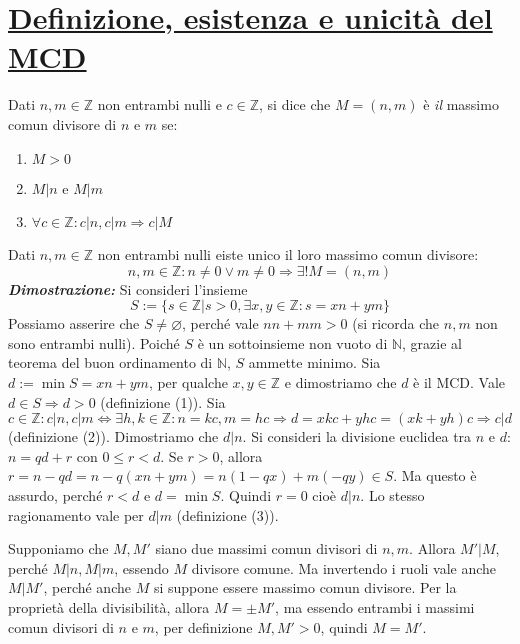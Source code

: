 \section{\underline{Definizione, esistenza e unicità del MCD}}
\begin{tcolorbox}[colback=yellow!30, colframe=yellow!30!black, title=Massimo Comun Divisore]
Dati $n,m \in \mathbb{Z}$ non entrambi nulli e $c\in\mathbb{Z}$, si dice che
$M = (n,m)$ è \textit{il} massimo comun divisore di $n$ e $m$ se:
\begin{enumerate}
    \item $M>0$
    \item $M|n$ e $M|m$
    \item $\forall c\in\mathbb{Z}:c|n, c|m \Longrightarrow c|M$
\end{enumerate}
\end{tcolorbox}
\begin{tcolorbox}[title={Esistenza e unicità del massimo comun divisore}]
Dati $n,m \in \mathbb{Z}$ non entrambi nulli eiste unico il loro
massimo comun divisore: \[ n,m \in \mathbb{Z}: n \not = 0 \vee m \not = 0 \Longrightarrow \exists! M = (n,m) \]
\emph{\textbf{Dimostrazione:}}  Si consideri l'insieme
\[S := \{s \in \mathbb{Z}| s > 0, \exists x,y \in \mathbb{Z}: s = xn + ym\}\]
Possiamo asserire che $S \not = \varnothing$, perché vale $nn + mm > 0$
(si ricorda che $n,m$ non sono entrambi nulli). Poiché $S$ è un sottoinsieme non vuoto
di $\mathbb{N}$, grazie al teorema del buon ordinamento di $\mathbb{N}$, $S$
ammette minimo. Sia $d:= \min S = xn + ym$, per qualche $x,y\in\mathbb{Z}$ e dimostriamo che
$d$ è il MCD. Vale $d\in S\Longrightarrow d>0$ (definizione (1)). Sia \[ c\in\mathbb{Z}:
c|n,c|m \Longleftrightarrow \exists h,k\in\mathbb{Z}:n=kc,m=hc \Longrightarrow d=xkc+yhc=(xk+yh)c \Longrightarrow c|d \]
(definizione (2)).  Dimostriamo che $d|n$.
Si consideri la divisione euclidea tra $n$ e $d$: $n = qd + r$ con
$0 \leq r < d$. Se $r > 0$, allora $r = n - qd = n - q(xn + ym) = n(1-qx) +
m(-qy) \in S$. Ma questo è assurdo, perché $r<d$ e $d = \min S$. Quindi
$r=0$ cioè $d|n$. Lo stesso ragionamento vale per $d|m$ (definizione (3)).

 Supponiamo che $M,M'$ siano due massimi comun
divisori di $n,m$. Allora $M'|M$, perché $M|n,M|m$, essendo $M$ divisore
comune. Ma invertendo i ruoli vale anche $M|M'$, perché anche $M$ si
suppone essere massimo comun divisore. Per la proprietà della divisibilità,
allora $M = \pm M'$, ma essendo entrambi i massimi comun divisori di $n$
e $m$, per definizione $M,M'>0$, quindi $M=M'$.
\cvd
\end{tcolorbox}
